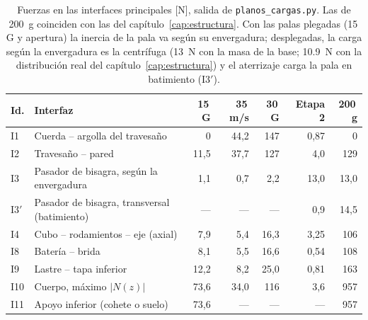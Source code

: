 \begin{table}[H]
\centering\small
\caption{Fuerzas en las interfaces principales [N], salida de
\texttt{planos\_cargas.py}. Las de \SI{200}{g} coinciden con las del
capítulo~\ref{cap:estructura}. Con las palas plegadas (15\,G y apertura) la inercia de la
pala va según su envergadura; desplegadas, la carga según la envergadura es la centrífuga
(\SI{13}{N} con la masa de la base; \SI{10.9}{N} con la distribución real del
capítulo~\ref{cap:estructura}) y el aterrizaje carga la pala en batimiento (I3$'$).}
\label{tab:planos-interfaces-cargas}
\begin{tabularx}{\textwidth}{@{}lYrrrrr@{}}
\toprule
\textbf{Id.} & \textbf{Interfaz} & \textbf{15\,G} & \textbf{35\,m/s} & \textbf{30\,G} & \textbf{Etapa 2} & \textbf{200\,g}\\\midrule
I1  & Cuerda -- argolla del travesaño        & 0    & 44,2 & 147  & 0,87 & 0\\
I2  & Travesaño -- pared                      & 11,5 & 37,7 & 127  & 4,0  & 129\\
I3  & Pasador de bisagra, según la envergadura & 1,1  & 0,7  & 2,2  & 13,0 & 13,0\\
I3$'$ & Pasador de bisagra, transversal (batimiento) & ---  & ---  & ---  & 0,9 & 14,5\\
I4  & Cubo -- rodamientos -- eje (axial)      & 7,9  & 5,4  & 16,3 & 3,25 & 106\\
I8  & Batería -- brida                       & 8,1  & 5,5  & 16,6 & 0,54 & 108\\
I9  & Lastre -- tapa inferior                 & 12,2 & 8,2  & 25,0 & 0,81 & 163\\
I10 & Cuerpo, máximo $|N(z)|$                 & 73,6 & 34,0 & 116  & 3,6  & 957\\
I11 & Apoyo inferior (cohete o suelo)         & 73,6 & ---  & ---  & ---  & 957\\
\bottomrule
\end{tabularx}
\end{table}

